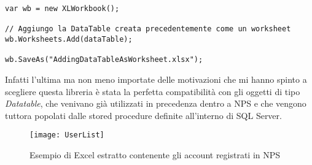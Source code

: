\newpage
\lstset{style=sharpc}
\begin{lstlisting}
var wb = new XLWorkbook();

// Aggiungo la DataTable creata precedentemente come un worksheet
wb.Worksheets.Add(dataTable);

wb.SaveAs("AddingDataTableAsWorksheet.xlsx");
\end{lstlisting}


Infatti l'ultima ma non meno importate delle motivazioni che mi hanno spinto a scegliere questa libreria è stata la perfetta compatibilità con gli oggetti di tipo \emph{Datatable}, che venivano già utilizzati in precedenza dentro a NPS e che vengono tuttora popolati dalle \gls{stored procedure} definite all'interno di SQL Server\footnotemark[5]
. 

\begin{figure}[h!]
\begin{center}
\texttt{[image: UserList]}
\caption{Esempio di Excel estratto contenente gli account registrati in NPS}
\label{tabella}
\end{center}
\end{figure}
\FloatBarrier


